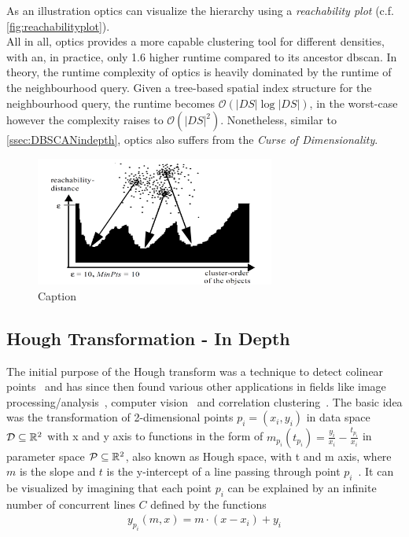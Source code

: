 As an illustration \gls{optics} can visualize the hierarchy using a \textit{reachability plot} (c.f. \autoref{fig:reachabilityplot}).\\

All in all, \gls{optics} provides a more capable clustering tool for different densities, with an, in practice, only 1.6 higher runtime compared to its ancestor \gls{dbscan}. In theory, the runtime complexity of \gls{optics} is heavily dominated by the runtime of the neighbourhood query. Given a tree-based spatial index structure for the neighbourhood query, the runtime becomes $\mathcal{O}(|DS| \log |DS|)$, in the worst-case however the complexity raises to $\mathcal{O}(|DS|^2)$. Nonetheless, similar to \autoref{ssec:DBSCANindepth}, \gls{optics} also suffers from the \textit{Curse of Dimensionality}.

\begin{figure}
    \centering
    \includegraphics[width=0.7\textwidth]{figures/reachabilityplot.png}
    \caption{Caption}
    \label{fig:reachabilityplot}
\end{figure}

\subsection{Hough Transformation - In Depth}\label{ssec:houghindepth}
The initial purpose of the Hough transform was a technique to detect colinear points~\cite{houghOriginal1962method} and has since then found various other applications in fields like image processing/analysis~\cite{rosenfeld1969picture,ballard1981generalizing}, computer vision~\cite{davies2004machine} and correlation clustering~\cite{CASHachtert2008robust}.
The basic idea was the transformation of 2-dimensional points $p_i = (x_i,y_i)$ in data space $\mathcal{D} \subseteq \mathbb{R}^2$ with x and y axis to functions in the form of ${m_{p_i}(t_{p_i}) = \frac{y_i}{x_i} - \frac{t_{p_i}}{x_i}}$ in parameter space $\mathcal{P} \subseteq \mathbb{R}^2$, also known as Hough space, with t and m axis, where $m$ is the slope and $t$ is the y-intercept of a line passing through point $p_i$~\cite{illingworth1988survey}. It can be visualized by imagining that each point $p_i$ can be explained by an infinite number of concurrent lines $C$ defined by the functions 
\begin{align}
    {y_{p_i}(m,x) = m \cdot (x - x_i) + y_i}
\end{align}

